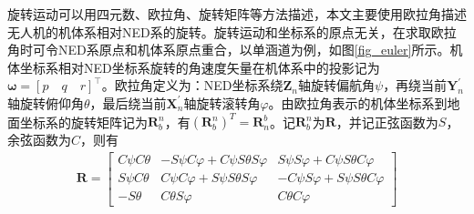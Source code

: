 旋转运动可以用四元数、欧拉角、旋转矩阵等方法描述，本文主要使用欧拉角描述无人机的机体系相对NED系的旋转。旋转运动和坐标系的原点无关，在求取欧拉角时可令NED系原点和机体系原点重合，以单涵道为例，如图\ref{fig_euler}所示。机体坐标系相对NED坐标系旋转的角速度矢量在机体系中的投影记为$ \bm{\omega}= [p \quad q \quad r]^\top $。欧拉角定义为：NED坐标系绕$ \bm{Z}_n $轴旋转偏航角$ \psi $，再绕当前$ \bm{Y}^{'}_n$轴旋转俯仰角$ \theta $，最后绕当前$ \bm{X}^{'}_n$轴旋转滚转角$ \varphi $。由欧拉角表示的机体坐标系到地面坐标系的旋转矩阵记为$ \bm{R}^n_b $，有$ ({\bm{R}^n_b})^T=\bm{R}^b_n $。记$ \bm{R}^n_b $为$ \bm{R}  $，并记正弦函数为$ S $，余弦函数为$ C $，则有
\begin{align}
\bm{R}=\begin{bmatrix}
C \psi C \theta & -S \psi C \varphi+C \psi S \theta S \varphi & S \psi S \varphi+C \psi S \theta C \varphi \\
S \psi C \theta & C \psi C \varphi+S \psi S \theta S \varphi & -C \psi S \varphi+S \psi S \theta C \varphi \\
-S \theta & C \theta S \varphi & C \theta C \varphi
\end{bmatrix}
\end{align}
